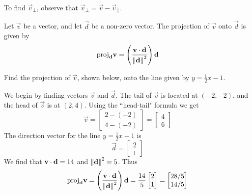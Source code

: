 \documentclass{ximera}
\begin{document}
To find $\vec{v}_{\perp}$, observe that $\vec{v}_{\perp}=\vec{v}-\vec{v}_{\parallel}$.


\begin{definition}\label{def:projection}
Let $\vec{v}$ be a vector, and let $\vec{d}$ be a non-zero vector.  The projection of $\vec{v}$ onto $\vec{d}$ is given by 
$$\text{proj}_{{\bf d}}{\bf v}=\left(\frac{{\bf v}\cdot{\bf d}}{\left\lVert{\bf d}\right\rVert^2}\right){\bf d}$$
\end{definition}

\begin{example}
Find the projection of $\vec{v}$, shown below, onto the line given by $y=\frac{1}{2}x-1$.

\begin{image}[2.5in]
\end{image}

\begin{explanation}
We begin by finding vectors $\vec{v}$ and $\vec{d}$. The tail of $\vec{v}$ is located at $(-2, -2)$, and the head of $\vec{v}$ is at $(2, 4)$.  Using the ``head-tail" formula we get 
$$\vec{v}=\begin{bmatrix}2-(-2)\\4-(-2)\end{bmatrix}=\begin{bmatrix}4\\6\end{bmatrix}$$ The direction vector for the line $y=\frac{1}{2}x-1$ is $$\vec{d}=\begin{bmatrix}2\\1\end{bmatrix}$$
We find that ${\bf v}\cdot{\bf d}=14$ and $\left\lVert{\bf d}\right\rVert^2=5$.
Thus $$\text{proj}_{{\bf d}}{\bf v}=\left(\frac{{\bf v}\cdot{\bf d}}{\left\lVert{\bf d}\right\rVert^2}\right){\bf d}=\frac{14}{5}\begin{bmatrix}2\\1\end{bmatrix}=\begin{bmatrix}28/5\\14/5\end{bmatrix}$$
\end{explanation}
\end{example}
\end{document}
